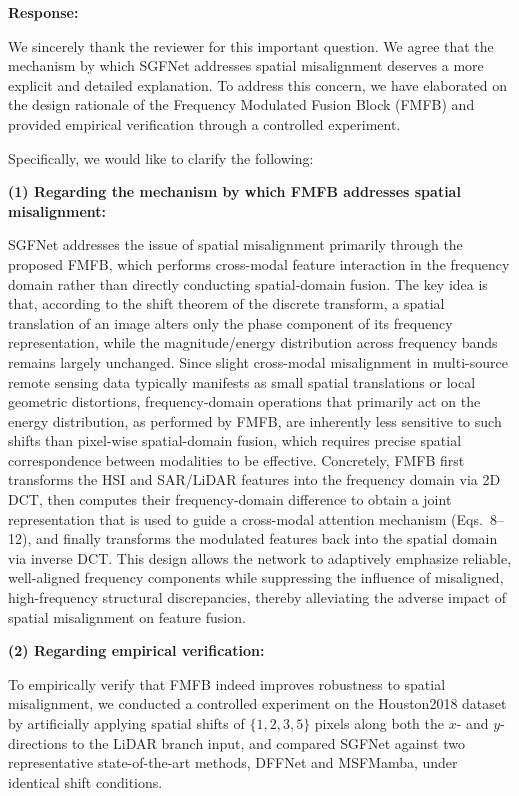 \textbf{Response:}

We sincerely thank the reviewer for this important question. We agree that the mechanism by which SGFNet addresses spatial misalignment deserves a more explicit and detailed explanation. To address this concern, we have elaborated on the design rationale of the Frequency Modulated Fusion Block (FMFB) and provided empirical verification through a controlled experiment.

Specifically, we would like to clarify the following:

\textbf{(1) Regarding the mechanism by which FMFB addresses spatial misalignment:}

SGFNet addresses the issue of spatial misalignment primarily through the proposed FMFB, which performs cross-modal feature interaction in the frequency domain rather than directly conducting spatial-domain fusion. The key idea is that, according to the shift theorem of the discrete transform, a spatial translation of an image alters only the phase component of its frequency representation, while the magnitude/energy distribution across frequency bands remains largely unchanged. Since slight cross-modal misalignment in multi-source remote sensing data typically manifests as small spatial translations or local geometric distortions, frequency-domain operations that primarily act on the energy distribution, as performed by FMFB, are inherently less sensitive to such shifts than pixel-wise spatial-domain fusion, which requires precise spatial correspondence between modalities to be effective. Concretely, FMFB first transforms the HSI and SAR/LiDAR features into the frequency domain via 2D DCT, then computes their frequency-domain difference to obtain a joint representation that is used to guide a cross-modal attention mechanism (Eqs.~8--12), and finally transforms the modulated features back into the spatial domain via inverse DCT. This design allows the network to adaptively emphasize reliable, well-aligned frequency components while suppressing the influence of misaligned, high-frequency structural discrepancies, thereby alleviating the adverse impact of spatial misalignment on feature fusion.

\textbf{(2) Regarding empirical verification:}

To empirically verify that FMFB indeed improves robustness to spatial misalignment, we conducted a controlled experiment on the Houston2018 dataset by artificially applying spatial shifts of $\{1, 2, 3, 5\}$ pixels along both the $x$- and $y$-directions to the LiDAR branch input, and compared SGFNet against two representative state-of-the-art methods, DFFNet and MSFMamba, under identical shift conditions. 

